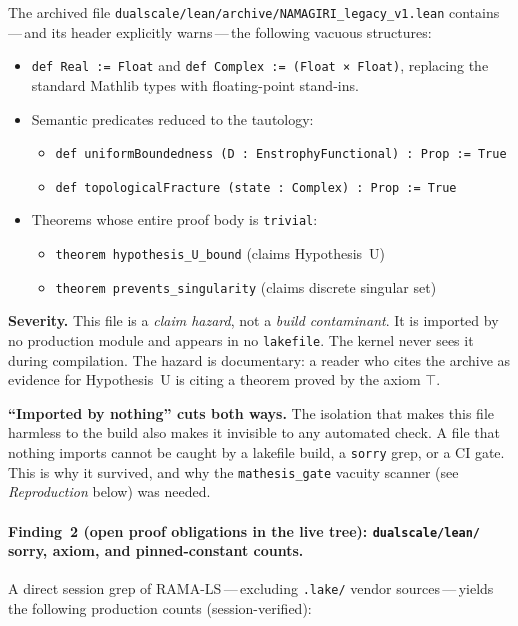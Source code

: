 The archived file
\texttt{dualscale/lean/archive/NAMAGIRI\_legacy\_v1.lean}
contains\,---\,and its header explicitly warns\,---\,the following vacuous
structures:

\begin{itemize}
  \item \verb|def Real := Float| and \verb|def Complex := (Float × Float)|,
    replacing the standard Mathlib types with floating-point stand-ins.
  \item Semantic predicates reduced to the tautology:
    \begin{itemize}
      \item \verb|def uniformBoundedness (D : EnstrophyFunctional) : Prop := True|
      \item \verb|def topologicalFracture (state : Complex) : Prop := True|
    \end{itemize}
  \item Theorems whose entire proof body is \verb|trivial|:
    \begin{itemize}
      \item \verb|theorem hypothesis_U_bound| (claims Hypothesis~U)
      \item \verb|theorem prevents_singularity| (claims discrete singular set)
    \end{itemize}
\end{itemize}

\noindent
\textbf{Severity.}
This file is a \emph{claim hazard}, not a \emph{build contaminant}.
It is imported by no production module and appears in no \texttt{lakefile}.
The kernel never sees it during compilation.
The hazard is documentary: a reader who cites the archive as evidence for
Hypothesis~U is citing a theorem proved by the axiom $\top$.

\noindent
\textbf{``Imported by nothing'' cuts both ways.}
The isolation that makes this file harmless to the build also makes it
invisible to any automated check.
A file that nothing imports cannot be caught by a lakefile build,
a \texttt{sorry} grep, or a CI gate.
This is why it survived, and why the \texttt{mathesis\_gate} vacuity
scanner (see \emph{Reproduction} below) was needed.

\paragraph{Finding~2 (open proof obligations in the live tree):
\texttt{dualscale/lean/} sorry, axiom, and pinned-constant counts.}

A direct session grep of RAMA-LS\,---\,excluding \texttt{.lake/} vendor
sources\,---\,yields the following production counts (session-verified):

